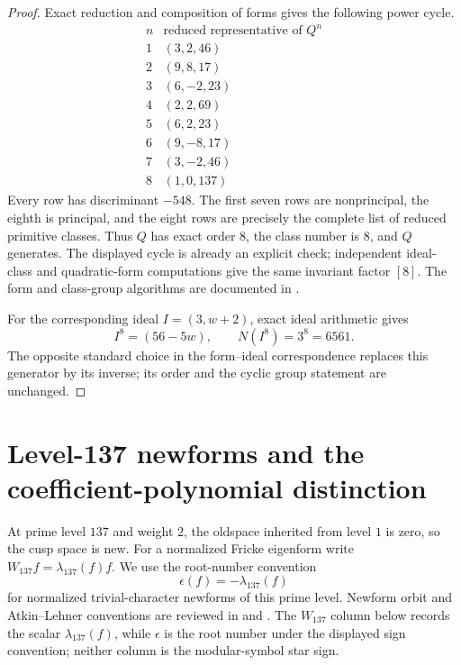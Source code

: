 \documentclass[11pt]{article}
\theoremstyle{definition}
\theoremstyle{remark}
\begin{document}
\begin{proof}
Exact reduction and composition of forms gives the following power cycle.
\[
\begin{array}{c|c}
  n & \text{reduced representative of }Q^n\\
  \hline
  1&(3,2,46)\\
  2&(9,8,17)\\
  3&(6,-2,23)\\
  4&(2,2,69)\\
  5&(6,2,23)\\
  6&(9,-8,17)\\
  7&(3,-2,46)\\
  8&(1,0,137)
\end{array}
\]
Every row has discriminant $-548$.  The first seven rows are nonprincipal,
the eighth is principal, and the eight rows are precisely the complete list of
reduced primitive classes.  Thus $Q$ has exact order $8$, the class number is
$8$, and $Q$ generates.  The displayed cycle is already an explicit
check; independent ideal-class and quadratic-form computations give the
same invariant factor $[8]$.  The form and class-group algorithms are documented in
\cite{SageQuadraticForms}.

For the corresponding ideal $I=(3,w+2)$, exact ideal arithmetic gives
\[
  I^8=(56-5w), \qquad N(I^8)=3^8=6561.
\]
The opposite standard choice in the form--ideal correspondence replaces this
generator by its inverse; its order and the cyclic group statement are
unchanged.
\end{proof}

\section{Level-137 newforms and the coefficient-polynomial distinction}

At prime level $137$ and weight $2$, the oldspace inherited from level $1$ is
zero, so the cusp space is new.  For a normalized Fricke eigenform write
$W_{137}f=\lambda_{137}(f)f$.  We use the root-number convention
\[
  \epsilon(f)=-\lambda_{137}(f)
\]
for normalized trivial-character newforms of this prime level.  Newform orbit
and Atkin--Lehner conventions are reviewed in
\cite[Chapter~9]{Stein2007} and
\cite[Sections~4.2 (p.~7), 4.5 (pp.~9--11), and 8.3 (pp.~28--29)]{BestEtAl2021}.
The $W_{137}$ column below records the scalar $\lambda_{137}(f)$, while
$\epsilon$ is the root number under the displayed sign convention; neither
column is the modular-symbol star sign.
\end{document}
